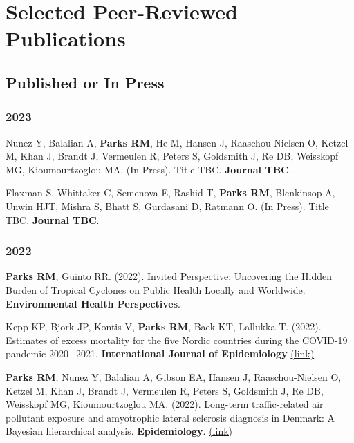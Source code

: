 \section*{Selected Peer-Reviewed Publications}

\subsection*{Published or In Press}

\subsubsection*{2023}

\noindent Nunez Y, Balalian A, \textbf{Parks RM}, He M, Hansen J, Raaschou-Nielsen O, Ketzel M, Khan J, Brandt J, Vermeulen R, Peters S, Goldsmith J, Re DB, Weisskopf MG, Kioumourtzoglou MA. (In Press). Title TBC. \textbf{Journal TBC}. \bigskip

\noindent Flaxman S, Whittaker C, Semenova E, Rashid T, \textbf{Parks RM}, Blenkinsop A, Unwin HJT, Mishra S, Bhatt S, Gurdasani D, Ratmann O. (In Press). Title TBC. \textbf{Journal TBC}. %

\subsubsection*{2022}

\noindent \textbf{Parks RM}, Guinto RR. (2022). Invited Perspective: Uncovering the Hidden Burden of Tropical Cyclones on Public Health Locally and Worldwide. \textbf{Environmental Health Perspectives}. \bigskip

\noindent Kepp KP, Bjork JP, Kontis V, \textbf{Parks RM}, Baek KT, Lallukka T. (2022). Estimates of excess mortality for the five Nordic countries during the COVID-19 pandemic 2020−2021, \textbf{International Journal of Epidemiology} \href{https://academic.oup.com/ije/advance-article/doi/10.1093/ije/dyac204/6798817#379089278}{(link)} \bigskip

\noindent \textbf{Parks RM}, Nunez Y, Balalian A,  Gibson EA, Hansen J, Raaschou-Nielsen O, Ketzel M, Khan J, Brandt J, Vermeulen R, Peters S, Goldsmith J, Re DB, Weisskopf MG, Kioumourtzoglou MA. (2022). Long-term traffic-related air pollutant exposure and amyotrophic lateral sclerosis diagnosis in Denmark: A Bayesian hierarchical analysis. \textbf{Epidemiology}. \href{https://journals.lww.com/epidem/Abstract/9900/Long_term_traffic_related_air_pollutant_exposure.55.aspx}{(link)} \bigskip

